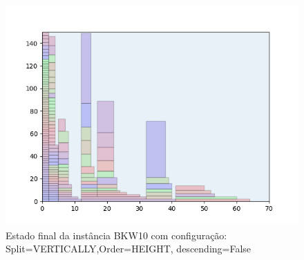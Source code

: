 \begin{figure}[H]
    \centering
    \caption[]{Estado final da instância BKW10 com configuração: Split=VERTICALLY,Order=HEIGHT, descending=False}
    \label{fig:bkw10-vertically-height-false}
    \includegraphics[scale=0.5]{output/figures/bkw/bkw10/vertically/height/false/000}
\end{figure}